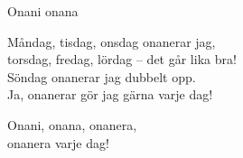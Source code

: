 \begin{song}{Onani onana}
	

	
	
	Måndag, tisdag, onsdag onanerar jag,\\
	torsdag, fredag, lördag -- det går lika bra!\\
	Söndag onanerar jag dubbelt opp.\\
	Ja, onanerar gör jag gärna varje dag!
	
	\begin{repetition}
		Onani, onana, onanera,\\
		onanera varje dag!
	\end{repetition}
	
\end{song}
